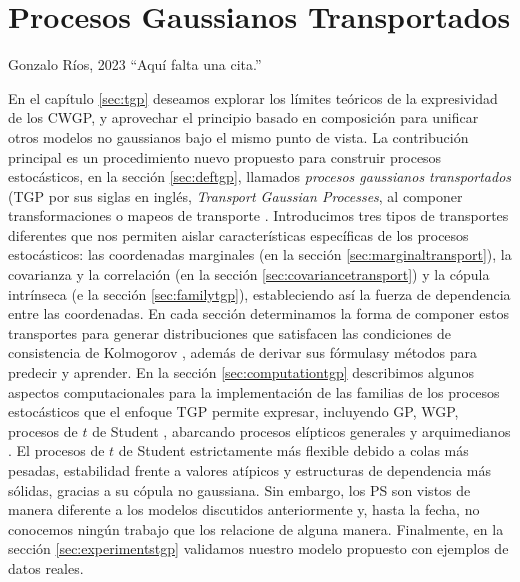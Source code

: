 
\chapter{Procesos Gaussianos Transportados}

\begin{chapquote}{Gonzalo Ríos, 2023}
	``Aquí falta una cita.''
\end{chapquote}

En el capítulo \ref{sec:tgp} deseamos explorar los límites teóricos de la expresividad de los CWGP, y aprovechar el principio basado en composición para unificar otros modelos no gaussianos bajo el mismo punto de vista. La contribución principal es un procedimiento nuevo propuesto para construir procesos estocásticos, en la sección \ref{sec:deftgp}, llamados \emph{procesos gaussianos transportados} (TGP por sus siglas en inglés, \emph{Transport Gaussian Processes}, al componer transformaciones o mapeos de transporte \cite{marzouk2016introduction}. Introducimos tres tipos de transportes diferentes que nos permiten aislar características específicas de los procesos estocásticos: las coordenadas marginales (en la sección \ref{sec:marginaltransport}), la covarianza y la correlación (en la sección \ref{sec:covariancetransport}) y la cópula intrínseca \cite{wilson2010copula} (e la sección \ref{sec:familytgp}), estableciendo así la fuerza de dependencia entre las coordenadas. En cada sección determinamos la forma de componer estos transportes para generar distribuciones que satisfacen las condiciones de consistencia de Kolmogorov \cite{tao2011introduction}, además de derivar sus fórmulasy métodos para predecir y aprender. En la sección \ref{sec:computationtgp} describimos algunos aspectos computacionales para la implementación de las familias de los procesos estocásticos que el enfoque TGP permite expresar, incluyendo GP, WGP, procesos de \(t\) de Student \cite{shah2014student}, abarcando procesos elípticos generales \cite{owen1983class} y arquimedianos \cite{mcneil2009multivariate}. El procesos de \(t\) de Student estrictamente más flexible debido a colas más pesadas, estabilidad frente a valores atípicos y estructuras de dependencia más sólidas, gracias a su cópula no gaussiana. Sin embargo, los PS son vistos de manera diferente a los modelos discutidos anteriormente y, hasta la fecha, no conocemos ningún trabajo que los relacione de alguna manera. Finalmente, en la sección \ref{sec:experimentstgp} validamos nuestro modelo propuesto con ejemplos de datos reales.


